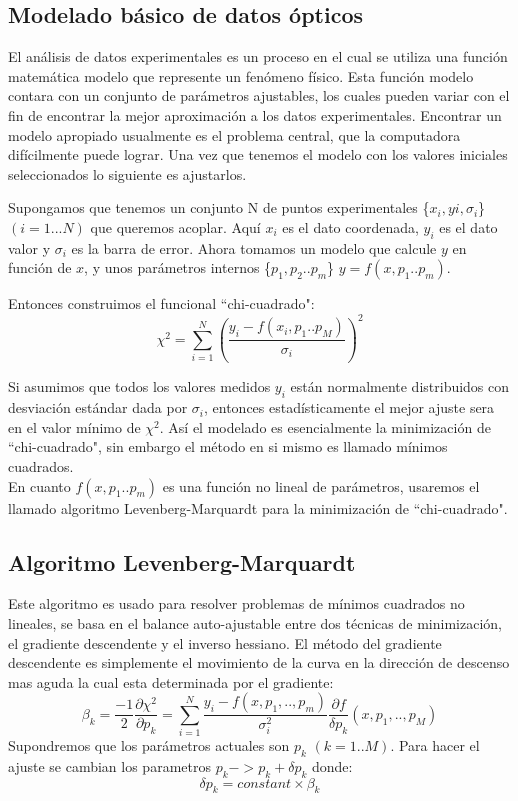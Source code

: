 \documentclass[a4paper,openright,12pt]{book}
\begin{document}
\subsection{Modelado básico de datos ópticos}
El análisis de datos experimentales es un proceso en el cual se utiliza una función matemática modelo que represente un fenómeno físico. Esta función modelo contara con un conjunto de parámetros ajustables, los cuales pueden variar con el fin de encontrar la mejor aproximación a los datos experimentales. Encontrar un modelo apropiado usualmente es el problema central, que la computadora difícilmente puede lograr. Una vez que tenemos el modelo con los valores iniciales seleccionados lo siguiente es ajustarlos.

Supongamos que tenemos un conjunto N de puntos experimentales \{$x_{i}, y{i}, \sigma_{i}$\} $(i=1...N)$ que queremos acoplar. Aquí $x_{i}$ es el dato coordenada, $y_{i}$ es el dato valor y $\sigma_{i}$ es la barra de error. Ahora tomamos un modelo que calcule $y$ en función de $x$,  y unos parámetros internos \{$p_{1},p_{2}..p_{m}$\} $y=f(x,p_{1}..p_{m})$.\

Entonces construimos el funcional ``chi-cuadrado":\\

\begin{equation}
 \chi^{2}=\sum_{i=1}^{N}(\frac{y_{i}-f(x_{i},p_{1}..p_{M})}{\sigma_{i}})^{2} 
\end{equation}

Si asumimos que todos los valores medidos $y_{i}$ están normalmente distribuidos con desviación estándar dada por $\sigma_{i}$, entonces estadísticamente  el mejor ajuste sera en el valor mínimo de $\chi^{2}$. Así el modelado es esencialmente la minimización de ``chi-cuadrado", sin embargo el método en si mismo es llamado mínimos cuadrados\cite{guide}.\\
En cuanto $f(x,p_{1}..p_{m})$ es una función no lineal de parámetros, usaremos el llamado algoritmo Levenberg-Marquardt para la minimización de ``chi-cuadrado".

\subsection{Algoritmo Levenberg-Marquardt}
Este algoritmo es usado para resolver problemas de mínimos cuadrados no lineales, se basa en el balance auto-ajustable entre dos técnicas de minimización, el gradiente descendente y el inverso hessiano. El método del gradiente descendente es simplemente el movimiento de la curva en la dirección de descenso mas aguda la cual esta determinada por el gradiente:\\
\begin{equation}\label{2.2}
\beta_{k}=\frac{-1}{2}\frac{\partial\chi^{2}}{\partial p_{k}}=\sum_{i=1}^{N}\frac{y_{i}-f(x,p_{1},..,p_{m})}{\sigma_{i}^{2}}\frac{\partial f}{\delta p_{k}}(x,p_{1},..,p_{M})
\end{equation}
Supondremos que los parámetros actuales son $p_{k}$ $(k=1..M)$. Para hacer el ajuste se cambian los parametros $p_{k}-> p_{k}+\delta p_{k}$ donde:
\begin{equation}
\delta p_{k}=constant \times \beta_{k}
\end{equation}
\end{document}
